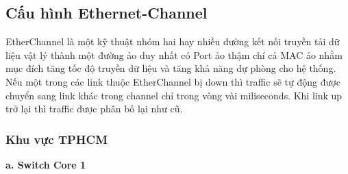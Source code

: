 \documentclass[12pt,a4paper]{report}
\begin{document}
\subsection{Cấu hình Ethernet-Channel}
\hspace*{1cm}EtherChannel là một kỹ thuật nhóm hai hay nhiều đường kết nối truyền tải dữ liệu vật lý thành một đường ảo duy nhất có Port ảo thậm chí cả MAC ảo nhằm mục đích tăng tốc độ truyền dữ liệu và tăng khả năng dự phòng cho hệ thống. Nếu một trong các link thuộc EtherChannel bị down thì traffic sẽ tự động được chuyển sang link khác trong channel chỉ trong vòng vài miliseconds. Khi link up trở lại thì traffic được phân bố lại như cũ.\\
\subsubsection{Khu vực TPHCM}
\hspace*{1cm}\textbf{a. Switch Core 1}\\
\end{document}
